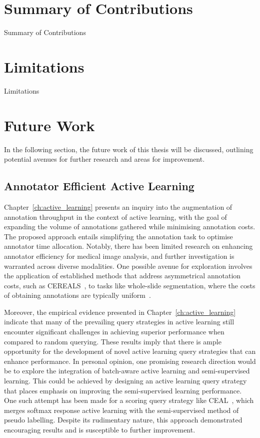 \section{Summary of Contributions}
Summary of Contributions



\section{Limitations}
Limitations



\section{Future Work}
In the following section, the future work of this thesis will be discussed, outlining potential avenues for further research and areas for improvement.

\subsection{Annotator Efficient Active Learning}
Chapter~\ref{ch:active_learning} presents an inquiry into the augmentation of annotation throughput in the context of active learning, with the goal of expanding the volume of annotations gathered while minimising annotation costs. The proposed approach entails simplifying the annotation task to optimise annotator time allocation. Notably, there has been limited research on enhancing annotator efficiency for medical image analysis, and further investigation is warranted across diverse modalities. One possible avenue for exploration involves the application of established methods that address asymmetrical annotation costs, such as CEREALS~\citep{mackowiak2018cereals}, to tasks like whole-slide segmentation, where the costs of obtaining annotations are typically uniform~\citep{budd2021survey}.

Moreover, the empirical evidence presented in Chapter~\ref{ch:active_learning} indicate that many of the prevailing query strategies in active learning still encounter significant challenges in achieving superior performance when compared to random querying. These results imply that there is ample opportunity for the development of novel active learning query strategies that can enhance performance. In personal opinion, one promising research direction would be to explore the integration of batch-aware active learning and semi-supervised learning. This could be achieved by designing an active learning query strategy that places emphasis on improving the semi-supervised learning performance. One such attempt has been made for a scoring query strategy like CEAL~\citep{lee2013pseudo}, which merges softmax response active learning with the semi-supervised method of pseudo labelling. Despite its rudimentary nature, this approach demonstrated encouraging results and is susceptible to further improvement.


